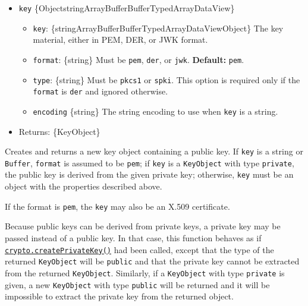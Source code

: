 \begin{itemize}
\tightlist
\item
  \texttt{key}
  \{Object\textbar string\textbar ArrayBuffer\textbar Buffer\textbar TypedArray\textbar DataView\}

  \begin{itemize}
  \tightlist
  \item
    \texttt{key}:
    \{string\textbar ArrayBuffer\textbar Buffer\textbar TypedArray\textbar DataView\textbar Object\}
    The key material, either in PEM, DER, or JWK format.
  \item
    \texttt{format}: \{string\} Must be
    \texttt{\textquotesingle{}pem\textquotesingle{}},
    \texttt{\textquotesingle{}der\textquotesingle{}}, or
    \texttt{\textquotesingle{}jwk\textquotesingle{}}. \textbf{Default:}
    \texttt{\textquotesingle{}pem\textquotesingle{}}.
  \item
    \texttt{type}: \{string\} Must be
    \texttt{\textquotesingle{}pkcs1\textquotesingle{}} or
    \texttt{\textquotesingle{}spki\textquotesingle{}}. This option is
    required only if the \texttt{format} is
    \texttt{\textquotesingle{}der\textquotesingle{}} and ignored
    otherwise.
  \item
    \texttt{encoding} \{string\} The string encoding to use when
    \texttt{key} is a string.
  \end{itemize}
\item
  Returns: \{KeyObject\}
\end{itemize}

Creates and returns a new key object containing a public key. If
\texttt{key} is a string or \texttt{Buffer}, \texttt{format} is assumed
to be \texttt{\textquotesingle{}pem\textquotesingle{}}; if \texttt{key}
is a \texttt{KeyObject} with type
\texttt{\textquotesingle{}private\textquotesingle{}}, the public key is
derived from the given private key; otherwise, \texttt{key} must be an
object with the properties described above.

If the format is \texttt{\textquotesingle{}pem\textquotesingle{}}, the
\texttt{\textquotesingle{}key\textquotesingle{}} may also be an X.509
certificate.

Because public keys can be derived from private keys, a private key may
be passed instead of a public key. In that case, this function behaves
as if
\hyperref[cryptocreateprivatekeykey]{\texttt{crypto.createPrivateKey()}}
had been called, except that the type of the returned \texttt{KeyObject}
will be \texttt{\textquotesingle{}public\textquotesingle{}} and that the
private key cannot be extracted from the returned \texttt{KeyObject}.
Similarly, if a \texttt{KeyObject} with type
\texttt{\textquotesingle{}private\textquotesingle{}} is given, a new
\texttt{KeyObject} with type
\texttt{\textquotesingle{}public\textquotesingle{}} will be returned and
it will be impossible to extract the private key from the returned
object.

